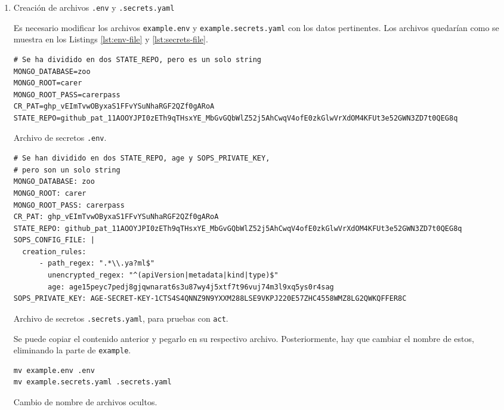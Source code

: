 \begin{enumerate}
  \item Creación de archivos \texttt{.env} y \texttt{.secrets.yaml}

    Es necesario modificar los archivos \texttt{example.env} y \texttt{example.secrets.yaml} con los datos pertinentes. Los archivos quedarían como se muestra en los Listings \ref{lst:env-file} y \ref{lst:secrets-file}.
  
\begin{listing}[!ht]
  \begin{verbatim}
# Se ha dividido en dos STATE_REPO, pero es un solo string
MONGO_DATABASE=zoo
MONGO_ROOT=carer
MONGO_ROOT_PASS=carerpass
CR_PAT=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
STATE_REPO=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
\end{verbatim}
\caption{Archivo de secretos \texttt{.env}.}
\label{lst:env-file}
\end{listing}

\begin{listing}[!ht]
  \begin{verbatim}
# Se han dividido en dos STATE_REPO, age y SOPS_PRIVATE_KEY,
# pero son un solo string
MONGO_DATABASE: zoo
MONGO_ROOT: carer
MONGO_ROOT_PASS: carerpass
CR_PAT: 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
STATE_REPO: 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
SOPS_CONFIG_FILE: |
  creation_rules:
      - path_regex: ".*\\.ya?ml$"
        unencrypted_regex: "^(apiVersion|metadata|kind|type)$"
        age: age15peyc7pedj8gjqwnarat6s3u87wy4j5xtf7t96vuj74m3l9xq5ys0r4sag
SOPS_PRIVATE_KEY: AGE-SECRET-KEY-1CTS4S4QNNZ9N9YXXM288LSE9VKPJ220E57ZHC4558WMZ8LG2QWKQFFER8C
\end{verbatim}
\caption{Archivo de secretos \texttt{.secrets.yaml}, para pruebas con \texttt{act}.}
\label{lst:secrets-file}
\end{listing}

Se puede copiar el contenido anterior y pegarlo en su respectivo archivo. Posteriormente, hay que cambiar el nombre de estos, eliminando la parte de \texttt{example}.

\begin{listing}[!ht]
  \begin{verbatim}
mv example.env .env
mv example.secrets.yaml .secrets.yaml
\end{verbatim}
\caption{Cambio de nombre de archivos ocultos.}
\end{listing}


\end{enumerate}
